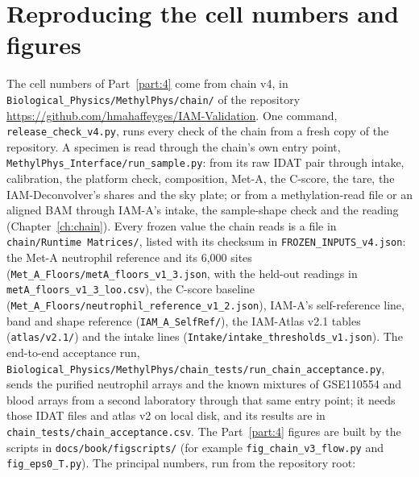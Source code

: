 \chapter{Reproducing the cell numbers and figures}\label{appendices:app:repro}

The cell numbers of Part~\ref{part:4} come from chain v4, in \texttt{Biological\_Physics/\allowbreak MethylPhys/\allowbreak chain/} of the repository
\url{https://github.com/hmahaffeyges/IAM-Validation}. One command, \texttt{release\_check\_v4.py}, runs every check of the chain from a fresh copy of the
repository. A specimen is read through the chain's own entry point, \texttt{MethylPhys\_Interface/\allowbreak run\_sample.py}: from its raw IDAT pair through
intake, calibration, the platform check, composition, Met-A, the C-score, the tare, the IAM-Deconvolver's shares and the sky plate; or from a methylation-read
file or an aligned BAM through IAM-A's intake, the sample-shape check and the reading (Chapter~\ref{ch:chain}). Every frozen value the chain reads is a file in
\texttt{chain/\allowbreak Runtime~Matrices/}, listed with its checksum in \texttt{FROZEN\_INPUTS\_v4.json}: the Met-A neutrophil reference and its 6,000 sites
(\texttt{Met\_A\_Floors/\allowbreak metA\_floors\_v1\_3.json}, with the held-out readings in \texttt{metA\_floors\_\allowbreak v1\_3\_loo.csv}), the C-score baseline
(\texttt{Met\_A\_Floors/\allowbreak neutrophil\_reference\_\allowbreak v1\_2.json}), IAM-A's self-reference line, band and shape reference
(\texttt{IAM\_A\_SelfRef/}), the IAM-Atlas v2.1 tables (\texttt{atlas/\allowbreak v2.1/}) and the intake lines (\texttt{Intake/\allowbreak intake\_thresholds\_\allowbreak v1.json}).
The end-to-end acceptance run, \texttt{Biological\_Physics/\allowbreak MethylPhys/\allowbreak chain\_tests/\allowbreak run\_chain\_acceptance.py}, sends the purified
neutrophil arrays and the known mixtures of GSE110554 and blood arrays from a second laboratory through that same entry point; it needs those IDAT files
and atlas v2 on local disk, and its results are in \texttt{chain\_tests/\allowbreak chain\_acceptance.csv}. The Part~\ref{part:4} figures are built by the scripts in
\texttt{docs/\allowbreak book/\allowbreak figscripts/} (for example \texttt{fig\_chain\_v3\_flow.py} and \texttt{fig\_eps0\_T.py}). The principal numbers, run from the
repository root:

